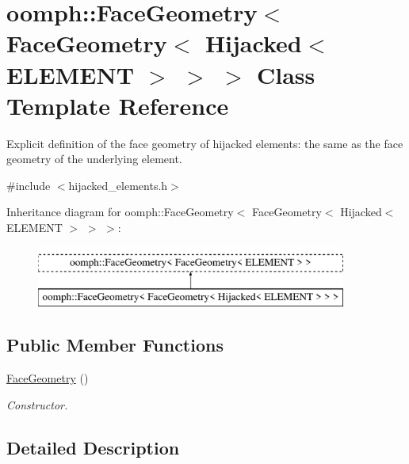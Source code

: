 \hypertarget{classoomph_1_1FaceGeometry_3_01FaceGeometry_3_01Hijacked_3_01ELEMENT_01_4_01_4_01_4}{}\section{oomph\+:\+:Face\+Geometry$<$ Face\+Geometry$<$ Hijacked$<$ E\+L\+E\+M\+E\+NT $>$ $>$ $>$ Class Template Reference}
\label{classoomph_1_1FaceGeometry_3_01FaceGeometry_3_01Hijacked_3_01ELEMENT_01_4_01_4_01_4}


Explicit definition of the face geometry of hijacked elements\+: the same as the face geometry of the underlying element.  




{\ttfamily \#include $<$hijacked\+\_\+elements.\+h$>$}

Inheritance diagram for oomph\+:\+:Face\+Geometry$<$ Face\+Geometry$<$ Hijacked$<$ E\+L\+E\+M\+E\+NT $>$ $>$ $>$\+:\begin{figure}[H]
\begin{center}
\leavevmode
\includegraphics[height=2.000000cm]{classoomph_1_1FaceGeometry_3_01FaceGeometry_3_01Hijacked_3_01ELEMENT_01_4_01_4_01_4}
\end{center}
\end{figure}
\subsection*{Public Member Functions}
\begin{DoxyCompactItemize}
\item 
\hyperlink{classoomph_1_1FaceGeometry_3_01FaceGeometry_3_01Hijacked_3_01ELEMENT_01_4_01_4_01_4_aeef3807dfeeb7259e2ff63b94c43181a}{Face\+Geometry} ()
\begin{DoxyCompactList}\small\item\em Constructor. \end{DoxyCompactList}\end{DoxyCompactItemize}


\subsection{Detailed Description}
